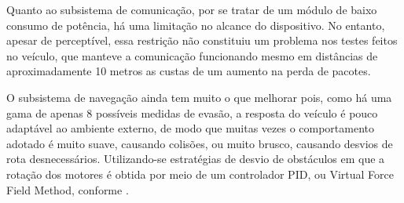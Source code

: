 Quanto ao subsistema de comunicação, por se tratar de um módulo de baixo
consumo de potência, há uma limitação no alcance do dispositivo. No entanto, apesar
de perceptível, essa restrição não constituiu um problema nos testes feitos no veículo,
que manteve a comunicação funcionando mesmo em distâncias de aproximadamente 10
metros as custas de um aumento na perda de pacotes.

O subsistema de navegação ainda tem muito o que melhorar pois, como há uma
gama de apenas 8 possíveis medidas de evasão, a resposta do veículo é pouco adaptável ao
ambiente externo, de modo que muitas vezes o comportamento adotado é muito suave,
causando colisões, ou muito brusco, causando desvios de rota desnecessários. Utilizando-se
estratégias de desvio de obstáculos em que a rotação dos motores é obtida por meio de
um controlador PID, ou Virtual Force Field Method, conforme  \cite{2016_artigo_2}.


